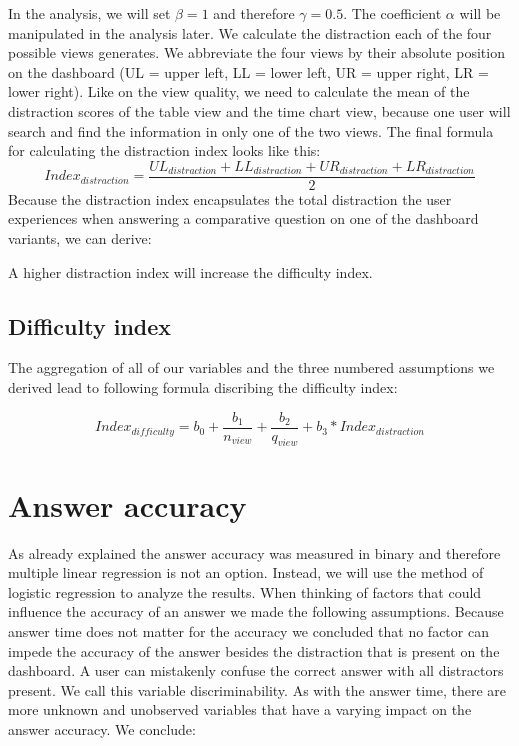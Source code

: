 In the analysis, we will set $\beta = 1$ and therefore $\gamma = 0.5$. The coefficient $\alpha$ will be manipulated in the analysis later. 
We calculate the distraction each of the four possible views generates. We abbreviate the four views by their absolute position on the dashboard
(UL = upper left, LL = lower left, UR = upper right, LR = lower right). Like on the view quality, we need to calculate the mean of the distraction scores
of the table view and the time chart view, because one user will search and find the information in only one of the two views. The final formula for
calculating the distraction index looks like this:
\begin{equation} \label{distractionIndexEquation}
    Index_{distraction} = \frac{UL_{distraction} + LL_{distraction} + UR_{distraction} + LR_{distraction}}{2}
\end{equation} 
Because the distraction index encapsulates the total distraction the user experiences when answering a comparative question on one of the dashboard variants,
we can derive:
\begin{statements}[resume]
    \item A higher distraction index will increase the difficulty index.
\end{statements}

\subsection{Difficulty index}

The aggregation of all of our variables and the three numbered assumptions we derived lead to following formula discribing the difficulty index:

\begin{equation} \label{difficultyIndexEquation}
    Index_{difficulty} = b_0 + \frac{b_1}{n_{view}} + \frac{b_2}{q_{view}} + b_3 * Index_{distraction}
\end{equation}


\section{Answer accuracy}
As already explained the answer accuracy was measured in binary and therefore multiple linear regression is not an option. Instead, we will use the
method of logistic regression to analyze the results. When thinking of factors that could influence the accuracy of an answer we made the
following assumptions. Because answer time does not matter for the accuracy we concluded that no factor can impede the accuracy of the answer besides the
distraction that is present on the dashboard. A user can mistakenly confuse the correct answer with all distractors present. We call this variable 
discriminability. As with the answer time, there are more unknown and unobserved variables that have a varying impact on the answer accuracy.
We conclude:

